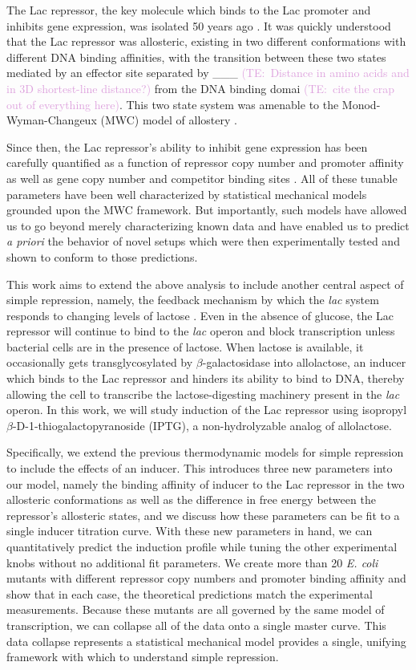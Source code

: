 \documentclass[10pt,letterpaper]{article}
\newcommand{\talComment}[1]{\textcolor{Plum}{(TE:~#1)}}
\begin{document}
The Lac repressor, the key molecule which binds to the Lac promoter and inhibits
gene expression, was isolated 50 years ago \cite{Gilbert1966}. It was quickly
understood that the Lac repressor was allosteric, existing in two different
conformations with different DNA binding affinities, with the transition between
these two states mediated by an effector site separated by \_\_\_
\talComment{Distance in amino acids and in 3D shortest-line distance?} from the
DNA binding domai \talComment{cite the crap out of everything here}. This two
state system was amenable to the Monod-Wyman-Changeux (MWC) model of allostery
\cite{MONOD1965}.

Since then, the Lac repressor's ability to inhibit gene expression has been carefully quantified
as a function of repressor copy number and promoter affinity \cite{Garcia2011}
as well as gene copy number and competitor binding sites \cite{Weinert2014}. All
of these tunable parameters have been well characterized by statistical
mechanical models grounded upon the MWC framework. But importantly, such models
have allowed us to go beyond merely characterizing known data and have enabled
us to predict \textit{a priori} the behavior of novel setups which were then
experimentally tested and shown to conform to those predictions.

This work aims to extend the above analysis to include another central aspect of
simple repression, namely, the feedback mechanism by which the \textit{lac}
system responds to changing levels of lactose \cite{JACOB1961}. Even in the
absence of glucose, the Lac repressor will continue to bind to the \textit{lac}
operon and block transcription unless bacterial cells are in the presence of
lactose. When lactose is available, it occasionally gets transglycosylated by
$\beta$-galactosidase into allolactose, an inducer which binds to the Lac
repressor and hinders its ability to bind to DNA, thereby allowing the cell to
transcribe the lactose-digesting machinery present in the \textit{lac} operon.
In this work, we will study induction of the Lac repressor using isopropyl
$\beta$-D-1-thiogalactopyranoside (IPTG), a non-hydrolyzable analog of
allolactose.

Specifically, we extend the previous thermodynamic models for simple repression
to include the effects of an inducer. This introduces three new parameters into
our model, namely the binding affinity of inducer to the Lac repressor in the
two allosteric conformations as well as the difference in free energy between
the repressor's allosteric states, and we discuss how these parameters can be
fit to a single inducer titration curve. With these new parameters in hand, we
can quantitatively predict the induction profile while tuning the other
experimental knobs without no additional fit parameters. We create more than 20
\textit{E. coli} mutants with different repressor copy numbers and promoter
binding affinity and show that in each case, the theoretical predictions match
the experimental measurements. Because these mutants are all governed by the
same model of transcription, we can collapse all of the data onto a single
master curve. This data collapse represents a statistical mechanical model
provides a single, unifying framework with which to understand simple
repression.
\end{document}
